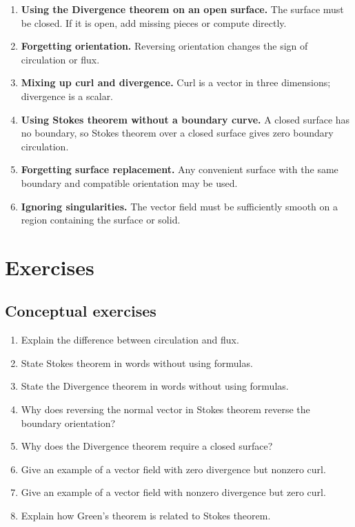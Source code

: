 \documentclass[11pt]{article}
\begin{document}
\begin{warningbox}
\begin{enumerate}
  \item \textbf{Using the Divergence theorem on an open surface.} The surface must be closed. If it is open, add missing pieces or compute directly.
  \item \textbf{Forgetting orientation.} Reversing orientation changes the sign of circulation or flux.
  \item \textbf{Mixing up curl and divergence.} Curl is a vector in three dimensions; divergence is a scalar.
  \item \textbf{Using Stokes theorem without a boundary curve.} A closed surface has no boundary, so Stokes theorem over a closed surface gives zero boundary circulation.
  \item \textbf{Forgetting surface replacement.} Any convenient surface with the same boundary and compatible orientation may be used.
  \item \textbf{Ignoring singularities.} The vector field must be sufficiently smooth on a region containing the surface or solid.
\end{enumerate}
\end{warningbox}

\section{Exercises}

\subsection*{Conceptual exercises}
\begin{enumerate}
  \item Explain the difference between circulation and flux.
  \item State Stokes theorem in words without using formulas.
  \item State the Divergence theorem in words without using formulas.
  \item Why does reversing the normal vector in Stokes theorem reverse the boundary orientation?
  \item Why does the Divergence theorem require a closed surface?
  \item Give an example of a vector field with zero divergence but nonzero curl.
  \item Give an example of a vector field with nonzero divergence but zero curl.
  \item Explain how Green's theorem is related to Stokes theorem.
\end{enumerate}
\end{document}
